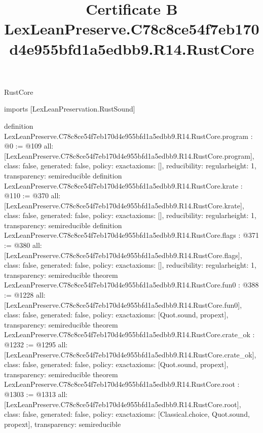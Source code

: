 \begin{lexlean}{RustCore}
\title{Certificate B LexLeanPreserve.C78c8ce54f7eb170d4e955bfd1a5edbb9.R14.RustCore}
\begin{coremodule}
imports [LexLeanPreservation.RustSound]

definition LexLeanPreserve.C78c8ce54f7eb170d4e955bfd1a5edbb9.R14.RustCore.program : @0 := @109 {
  all: [LexLeanPreserve.C78c8ce54f7eb170d4e955bfd1a5edbb9.R14.RustCore.program],
  class: false,
  generated: false,
  policy: exact{axioms: []},
  reducibility: regular{height: 1},
  transparency: semireducible
}
definition LexLeanPreserve.C78c8ce54f7eb170d4e955bfd1a5edbb9.R14.RustCore.krate : @110 := @370 {
  all: [LexLeanPreserve.C78c8ce54f7eb170d4e955bfd1a5edbb9.R14.RustCore.krate],
  class: false,
  generated: false,
  policy: exact{axioms: []},
  reducibility: regular{height: 1},
  transparency: semireducible
}
definition LexLeanPreserve.C78c8ce54f7eb170d4e955bfd1a5edbb9.R14.RustCore.flags : @371 := @380 {
  all: [LexLeanPreserve.C78c8ce54f7eb170d4e955bfd1a5edbb9.R14.RustCore.flags],
  class: false,
  generated: false,
  policy: exact{axioms: []},
  reducibility: regular{height: 1},
  transparency: semireducible
}
theorem LexLeanPreserve.C78c8ce54f7eb170d4e955bfd1a5edbb9.R14.RustCore.fun0 : @388 := @1228 {
  all: [LexLeanPreserve.C78c8ce54f7eb170d4e955bfd1a5edbb9.R14.RustCore.fun0],
  class: false,
  generated: false,
  policy: exact{axioms: [Quot.sound, propext]},
  transparency: semireducible
}
theorem LexLeanPreserve.C78c8ce54f7eb170d4e955bfd1a5edbb9.R14.RustCore.crate_ok : @1232 := @1295 {
  all: [LexLeanPreserve.C78c8ce54f7eb170d4e955bfd1a5edbb9.R14.RustCore.crate_ok],
  class: false,
  generated: false,
  policy: exact{axioms: [Quot.sound, propext]},
  transparency: semireducible
}
theorem LexLeanPreserve.C78c8ce54f7eb170d4e955bfd1a5edbb9.R14.RustCore.root : @1303 := @1313 {
  all: [LexLeanPreserve.C78c8ce54f7eb170d4e955bfd1a5edbb9.R14.RustCore.root],
  class: false,
  generated: false,
  policy: exact{axioms: [Classical.choice, Quot.sound, propext]},
  transparency: semireducible
}


\end{coremodule}
\end{lexlean}
